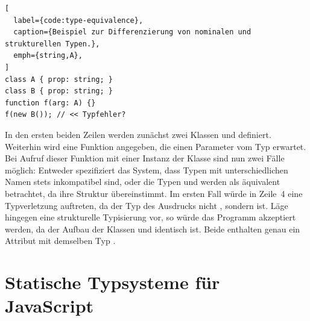 \begin{lstlisting}[
  label={code:type-equivalence},
  caption={Beispiel zur Differenzierung von nominalen und strukturellen Typen.},
  emph={string,A},
]
class A { prop: string; }
class B { prop: string; }
function f(arg: A) {}
f(new B()); // << Typfehler?
\end{lstlisting}

In den ersten beiden Zeilen werden zunächst zwei Klassen  und  definiert. Weiterhin wird eine Funktion  angegeben, die einen Parameter vom Typ  erwartet. Bei Aufruf dieser Funktion mit einer Instanz der Klasse  sind nun zwei Fälle möglich: Entweder spezifiziert das System, dass Typen mit unterschiedlichen Namen stets inkompatibel sind, oder die Typen  und  werden als äquivalent betrachtet, da ihre Struktur übereinstimmt. Im ersten Fall würde in Zeile~4 eine Typverletzung auftreten, da der Typ des Ausdrucks  nicht , sondern  ist. Läge hingegen eine strukturelle Typisierung vor, so würde das Programm akzeptiert werden, da der Aufbau der Klassen  und  identisch ist. Beide enthalten genau ein Attribut  mit demselben Typ .

\section{Statische Typsysteme für JavaScript}
\label{sec:static-typesystems-for-js}


